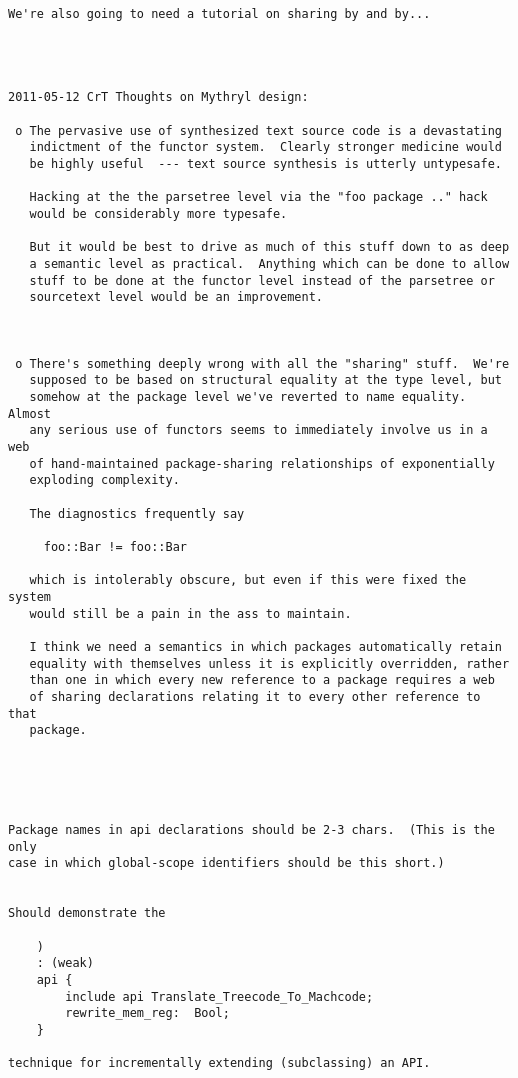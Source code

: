 \begin{verbatim}
We're also going to need a tutorial on sharing by and by... 




2011-05-12 CrT Thoughts on Mythryl design: 

 o The pervasive use of synthesized text source code is a devastating 
   indictment of the functor system.  Clearly stronger medicine would 
   be highly useful  --- text source synthesis is utterly untypesafe. 

   Hacking at the the parsetree level via the "foo package .." hack 
   would be considerably more typesafe. 

   But it would be best to drive as much of this stuff down to as deep 
   a semantic level as practical.  Anything which can be done to allow 
   stuff to be done at the functor level instead of the parsetree or 
   sourcetext level would be an improvement. 



 o There's something deeply wrong with all the "sharing" stuff.  We're 
   supposed to be based on structural equality at the type level, but 
   somehow at the package level we've reverted to name equality.  Almost 
   any serious use of functors seems to immediately involve us in a web 
   of hand-maintained package-sharing relationships of exponentially 
   exploding complexity. 

   The diagnostics frequently say 

     foo::Bar != foo::Bar 

   which is intolerably obscure, but even if this were fixed the system 
   would still be a pain in the ass to maintain. 

   I think we need a semantics in which packages automatically retain 
   equality with themselves unless it is explicitly overridden, rather 
   than one in which every new reference to a package requires a web 
   of sharing declarations relating it to every other reference to that 
   package. 





Package names in api declarations should be 2-3 chars.  (This is the only 
case in which global-scope identifiers should be this short.) 


Should demonstrate the 

    ) 
    : (weak) 
    api { 
        include api Translate_Treecode_To_Machcode; 
        rewrite_mem_reg:  Bool; 
    }

technique for incrementally extending (subclassing) an API. 






\end{verbatim}
